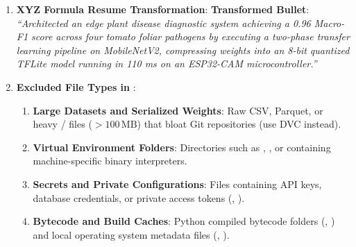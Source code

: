 \begin{enumerate}
\begin{enumerate}
        \item \textbf{Final RMSLE Score}:
        \begin{align*}
        \text{MSLE} &= \frac{0.009082 + 0.011101}{2} = \frac{0.020183}{2} \approx 0.0100915 \\
        \text{RMSLE} &= \sqrt{0.0100915} \approx \mathbf{0.10046}
        \end{align*}

        \item \textbf{Relative Error Comparison}:
        Property A was over-predicted by $+10.0\%$ ($\$110\text{k} / \$100\text{k}$). Property B was under-predicted by $-10.0\%$ ($\$450\text{k} / \$500\text{k}$). Both individual squared log errors are almost identical ($\approx 0.010$), proving that RMSLE penalizes relative proportional errors equally regardless of absolute price scale.
    \end{enumerate}

    \item \textbf{XYZ Formula Resume Transformation}:
    \textbf{Transformed Bullet}:
    \emph{``Architected an edge plant disease diagnostic system achieving a 0.96 Macro-F1 score across four tomato foliar pathogens by executing a two-phase transfer learning pipeline on MobileNetV2, compressing weights into an 8-bit quantized TFLite model running in 110 ms on an ESP32-CAM microcontroller.''}

    \item \textbf{Excluded File Types in }:
    \begin{enumerate}
        \item \textbf{Large Datasets and Serialized Weights}: Raw CSV, Parquet, or heavy / files ($> 100\,\text{MB}$) that bloat Git repositories (use DVC instead).
        \item \textbf{Virtual Environment Folders}: Directories such as , , or  containing machine-specific binary interpreters.
        \item \textbf{Secrets and Private Configurations}: Files containing API keys, database credentials, or private access tokens (, ).
        \item \textbf{Bytecode and Build Caches}: Python compiled bytecode folders (, ) and local operating system metadata files (, ).
    \end{enumerate}
\end{enumerate}